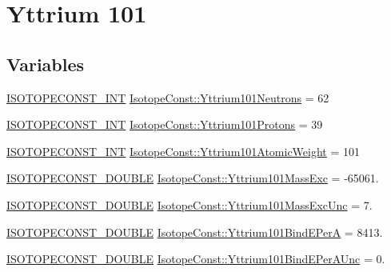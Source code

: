 \hypertarget{group___isotope_const-_yttrium-_y101}{}\section{Yttrium 101}
\label{group___isotope_const-_yttrium-_y101}
\subsection*{Variables}
\begin{DoxyCompactItemize}
\item 
\mbox{\hyperlink{group___isotope_const-_macros_ga5f18360b3e99483a35c32d789e62621c}{I\+S\+O\+T\+O\+P\+E\+C\+O\+N\+S\+T\+\_\+\+I\+NT}} \mbox{\hyperlink{group___isotope_const-_yttrium-_y101_gaec4c64c11eaa2bd8d414729cb1361368}{Isotope\+Const\+::\+Yttrium101\+Neutrons}} = 62
\item 
\mbox{\hyperlink{group___isotope_const-_macros_ga5f18360b3e99483a35c32d789e62621c}{I\+S\+O\+T\+O\+P\+E\+C\+O\+N\+S\+T\+\_\+\+I\+NT}} \mbox{\hyperlink{group___isotope_const-_yttrium-_y101_gaed1124f302bb3cf993d55d1751adf3e1}{Isotope\+Const\+::\+Yttrium101\+Protons}} = 39
\item 
\mbox{\hyperlink{group___isotope_const-_macros_ga5f18360b3e99483a35c32d789e62621c}{I\+S\+O\+T\+O\+P\+E\+C\+O\+N\+S\+T\+\_\+\+I\+NT}} \mbox{\hyperlink{group___isotope_const-_yttrium-_y101_gac52fe3e6b3ef5cd3269e545bf56b795c}{Isotope\+Const\+::\+Yttrium101\+Atomic\+Weight}} = 101
\item 
\mbox{\hyperlink{group___isotope_const-_macros_ga8f45a7272ce02c0b4c65c44636ed719a}{I\+S\+O\+T\+O\+P\+E\+C\+O\+N\+S\+T\+\_\+\+D\+O\+U\+B\+LE}} \mbox{\hyperlink{group___isotope_const-_yttrium-_y101_gaf4cc19173591bb5c6e0fbbc4fd8f763e}{Isotope\+Const\+::\+Yttrium101\+Mass\+Exc}} = -\/65061.
\item 
\mbox{\hyperlink{group___isotope_const-_macros_ga8f45a7272ce02c0b4c65c44636ed719a}{I\+S\+O\+T\+O\+P\+E\+C\+O\+N\+S\+T\+\_\+\+D\+O\+U\+B\+LE}} \mbox{\hyperlink{group___isotope_const-_yttrium-_y101_ga009d792dcdb97350cedffdf334b91db4}{Isotope\+Const\+::\+Yttrium101\+Mass\+Exc\+Unc}} = 7.
\item 
\mbox{\hyperlink{group___isotope_const-_macros_ga8f45a7272ce02c0b4c65c44636ed719a}{I\+S\+O\+T\+O\+P\+E\+C\+O\+N\+S\+T\+\_\+\+D\+O\+U\+B\+LE}} \mbox{\hyperlink{group___isotope_const-_yttrium-_y101_ga5de4d07301a6f339e8e147c1169af683}{Isotope\+Const\+::\+Yttrium101\+Bind\+E\+PerA}} = 8413.
\item 
\mbox{\hyperlink{group___isotope_const-_macros_ga8f45a7272ce02c0b4c65c44636ed719a}{I\+S\+O\+T\+O\+P\+E\+C\+O\+N\+S\+T\+\_\+\+D\+O\+U\+B\+LE}} \mbox{\hyperlink{group___isotope_const-_yttrium-_y101_ga107e373a0005e093a3ae9d85c13c965f}{Isotope\+Const\+::\+Yttrium101\+Bind\+E\+Per\+A\+Unc}} = 0.

\end{DoxyCompactItemize}
